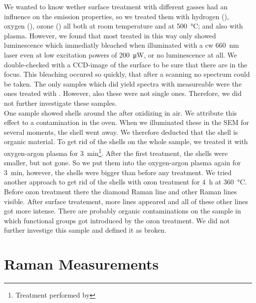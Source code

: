 		We wanted to know wether surface treatment with different gasses had an influence on the emission properties, so we treated them with hydrogen (), oxygen (), ozone () all both at room temperature and at \SI{500}{\celsius}; and also with  plasma. 
		However, we found that most \nds treated in this way only showed luminescence which immediatly bleached when illuminated with a cw \SI{660}{nm} laser even at low excitation powers of \SI{200}{\micro\watt}, or no luminescence at all.
		We double-checked with a CCD-image of the surface to be sure that there are \nds in the focus.
		This bleaching occured so quickly, that after a scanning no spectrum could be taken.
		The only samples which did yield spectra with measureable \ZPLs were the ones treated with .
		However, also these \sivs were not single ones.
		Therefore, we did not further investigate these samples.
		\\
		One sample showed shells around the \nd after oxidizing in air. 
		We attribute this effect to a contamination in the oven.
		When we illuminated these \nds in the SEM for several moments, the shell went away.
		We therefore deducted that the shell is organic material.
		To get rid of the shells on the whole sample, we treated it with oxygen-argon plasma for \SI{3}{min}\footnote{Treatment performed by \schmauch}.
		After the first treatment, the shells were smaller, but not gone.
		So we put them into the oxygen-argon plasma again for \SI{3}{min}, however, the shells were bigger than before any treatment.
		We tried another approach to get rid of the shells with ozon treatment for \SI{4}{\hour} at \SI{360}{\celsius}.
		Before ozon treatment there the diamond Raman line and other Raman lines visible.
		After surface treatement, more lines appeared and all of these other lines got more intense.
		There are probably organic contaminations on the sample in which functional groups got introduced by the ozon treatment.
		We did not further investige this sample and defined it as broken.



	\section{Raman Measurements} \label{sec::raman}


